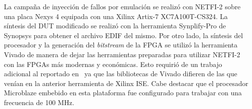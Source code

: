 \documentclass[a4paper,openright,12pt]{report}
\begin{document}
La campaña de inyección de fallos por emulación se realizó con NETFI-2 sobre una placa Nexys 4 equipada con una Xilinx Artix-7 XC7A100T-CS324. La síntesis del DUT modificado se realizó con la herramienta Synplify-Pro de Synopsys para obtener el archivo EDIF del mismo. Por otro lado, la síntesis del procesador y la generación del \textit{bitstream} de la FPGA se utilizó la herramienta Vivado de manera de dejar las herramientas preparadas para utilizar NETFI-2 con las FPGAs más modernas y económicas. Esto requirió de un trabajo adicional al reportado en~\cite{Mansour2013-1, Mansour2013-2} ya que las bibliotecas de Vivado difieren de las que venían en la anterior herramienta de Xilinx ISE. Cabe destacar que el procesador Microblaze embebido en esta plataforma fue configurado para trabajar con una frecuencia de 100 MHz.  
\end{document}
